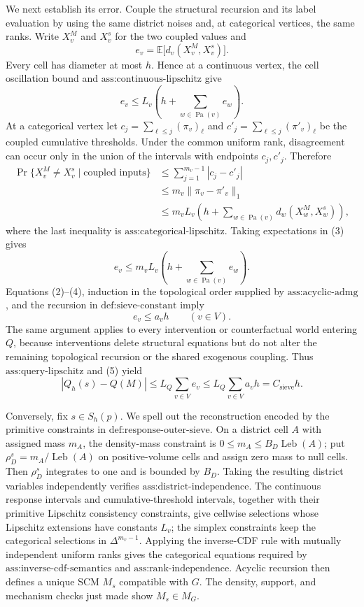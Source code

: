 We next establish its error.  Couple the structural recursion and its label evaluation by using the same district noises and, at categorical vertices, the same ranks.  Write \(X_v^M\) and \(X_v^s\) for the two coupled values and
\[
e_v=\mathbb E\bigl[d_v(X_v^M,X_v^s)\bigr].
\]
Every cell has diameter at most \(h\).  Hence at a continuous vertex, the cell oscillation bound and \(\text{ass:continuous-lipschitz}\) give
\[
e_v\leq L_v\left(h+\sum_{w\in\operatorname{Pa}(v)}e_w\right).    \tag{2}
\]
At a categorical vertex let \(c_j=\sum_{\ell\leq j}(\pi_v)_\ell\) and \(c'_j=\sum_{\ell\leq j}(\pi'_v)_\ell\) be the coupled cumulative thresholds.  Under the common uniform rank, disagreement can occur only in the union of the intervals with endpoints \(c_j,c'_j\).  Therefore
\[
\begin{aligned}
\Pr\{X_v^M\ne X_v^s\mid\text{coupled inputs}\}
&\leq \sum_{j=1}^{m_v-1}|c_j-c'_j|\\
&\leq m_v\lVert\pi_v-\pi'_v\rVert_1\\
&\leq m_vL_v\left(h+\sum_{w\in\operatorname{Pa}(v)}d_w(X_w^M,X_w^s)\right),
\end{aligned}                                                       \tag{3}
\]
where the last inequality is \(\text{ass:categorical-lipschitz}\).  Taking expectations in (3) gives
\[
e_v\leq m_vL_v\left(h+\sum_{w\in\operatorname{Pa}(v)}e_w\right). \tag{4}
\]
Equations (2)--(4), induction in the topological order supplied by \(\text{ass:acyclic-admg}\), and the recursion in \(\text{def:sieve-constant}\) imply
\[
e_v\leq a_vh\qquad(v\in V).                                      \tag{5}
\]
The same argument applies to every intervention or counterfactual world entering \(Q\), because interventions delete structural equations but do not alter the remaining topological recursion or the shared exogenous coupling.  Thus \(\text{ass:query-lipschitz}\) and (5) yield
\[
|Q_h(s)-Q(M)|
 \leq L_Q\sum_{v\in V}e_v
 \leq L_Q\sum_{v\in V}a_vh
 =C_{\mathrm{sieve}}h.                                           \tag{6}
\]

Conversely, fix \(s\in S_h(p)\).  We spell out the reconstruction encoded by the primitive constraints in \(\text{def:response-outer-sieve}\).  On a district cell \(A\) with assigned mass \(m_A\), the density-mass constraint is \(0\leq m_A\leq B_D\operatorname{Leb}(A)\); put \(\rho_D^s=m_A/\operatorname{Leb}(A)\) on positive-volume cells and assign zero mass to null cells.  Then \(\rho_D^s\) integrates to one and is bounded by \(B_D\).  Taking the resulting district variables independently verifies \(\text{ass:district-independence}\).  The continuous response intervals and cumulative-threshold intervals, together with their primitive Lipschitz consistency constraints, give cellwise selections whose Lipschitz extensions have constants \(L_v\); the simplex constraints keep the categorical selections in \(\Delta^{m_v-1}\).  Applying the inverse-CDF rule with mutually independent uniform ranks gives the categorical equations required by \(\text{ass:inverse-cdf-semantics}\) and \(\text{ass:rank-independence}\).  Acyclic recursion then defines a unique SCM \(M_s\) compatible with \(G\).  The density, support, and mechanism checks just made show \(M_s\in M_G\).

